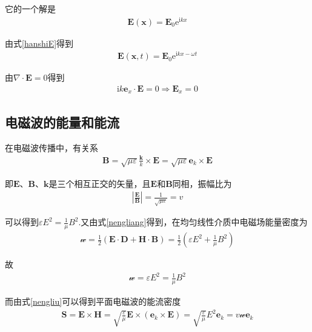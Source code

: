 \documentclass[main.tex]{subfiles}
\begin{document}
它的一个解是
\begin{align}
    \boldsymbol{E}(\boldsymbol{x}) = \boldsymbol{E}_0\mathrm{e}^{\mathrm{i}kx}
\end{align}

由式\ref{hanshiE}得到
\begin{align}
    \boldsymbol{E}(\boldsymbol{x},t) = \boldsymbol{E}_0\mathrm{e}^{\mathrm{i}kx-\omega t}
\end{align}

由$\nabla \cdot \boldsymbol{E} = 0$得到
\begin{align}
    \mathrm{i}k\boldsymbol{e}_x \cdot \boldsymbol{E} = 0 \Longrightarrow \boldsymbol{E}_x = 0
\end{align}

\subsection{电磁波的能量和能流}

在电磁波传播中，有关系
\begin{align}
    \boldsymbol{B} = \sqrt{\mu \varepsilon}\frac{\boldsymbol{k}}{k}\times \boldsymbol{E} = \sqrt{\mu \varepsilon}\boldsymbol{e}_k \times \boldsymbol{E}
\end{align}

即$\boldsymbol{E}$、$\boldsymbol{B}$、$\boldsymbol{k}$是三个相互正交的矢量，且$\boldsymbol{E}$和$\boldsymbol{B}$同相，振幅比为
\begin{align}
    \left|\frac{\boldsymbol{E}}{\boldsymbol{B}}\right| = \frac{1}{\sqrt{\mu \varepsilon}} = v
\end{align}

可以得到$\displaystyle \varepsilon E^2 = \frac{1}{\mu}B^2$.又由式\ref{nengliang}得到，在均匀线性介质中电磁场能量密度为
\begin{align}
    \mathscr{w} = \frac{1}{2} (\boldsymbol{E} \cdot \boldsymbol{D} + \boldsymbol{H} \cdot \boldsymbol{B}) = \frac{1}{2}\left(\varepsilon E^2+\frac{1}{\mu}B^2 \right)
\end{align}

故
\begin{align}
    \mathscr{w} = \varepsilon E^2 =\frac{1}{\mu}B^2
\end{align}

而由式\ref{nengliu}可以得到平面电磁波的能流密度
\begin{align}
    \boldsymbol{S} = \boldsymbol{E}\times \boldsymbol{H} = \sqrt{\frac{\varepsilon}{\mu}}\boldsymbol{E}\times (\boldsymbol{e}_k \times \boldsymbol{E}) = \sqrt{\frac{\varepsilon}{\mu}}E^2 \boldsymbol{e}_k = v \mathscr{w} \boldsymbol{e}_k
\end{align}
\end{document}

